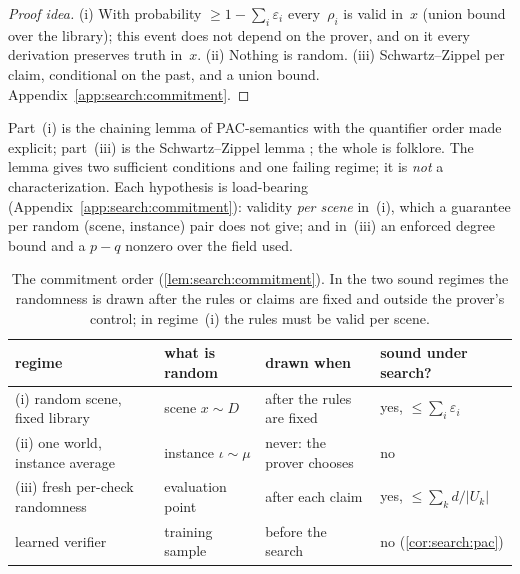 \begin{proof}[Proof idea]
(i) With probability $\ge1-\sum_i\varepsilon_i$ every~$\rho_i$ is valid in~$x$ (union bound over the library); this event does not depend on the prover, and on it every derivation preserves truth in~$x$. (ii) Nothing is random. (iii) Schwartz--Zippel per claim, conditional on the past, and a union bound. Appendix~\ref{app:search:commitment}.
\end{proof}

Part~(i) is the chaining lemma of PAC-semantics \citep{valiant2000robust} with the quantifier order made explicit; part~(iii) is the Schwartz--Zippel lemma \citep{schwartz1980fast,zippel1979probabilistic,demillo1978probabilistic}; the whole is folklore. The lemma gives two sufficient conditions and one failing regime; it is \emph{not} a characterization. Each hypothesis is load-bearing (Appendix~\ref{app:search:commitment}): validity \emph{per scene} in~(i), which a guarantee per random (scene, instance) pair does not give; and in~(iii) an enforced degree bound and a $p-q$ nonzero over the field used.

\begin{table}[t]
\centering\small
\begin{tabular}{@{}llll@{}}
\toprule
regime & what is random & drawn when & sound under search?\\
\midrule
(i) random scene, fixed library & scene $x\sim D$ & after the rules are fixed & yes, $\le\sum_i\varepsilon_i$\\
(ii) one world, instance average & instance $\iota\sim\mu$ & never: the prover chooses & no\\
(iii) fresh per-check randomness & evaluation point & after each claim & yes, $\le\sum_k d/|U_k|$\\
learned verifier & training sample & before the search & no (\cref{cor:search:pac})\\
\bottomrule
\end{tabular}
\caption{The commitment order (\cref{lem:search:commitment}). In the two sound regimes the randomness is drawn after the rules or claims are fixed and outside the prover's control; in regime~(i) the rules must be valid per scene.}
\label{tab:search:commitment}
\end{table}

